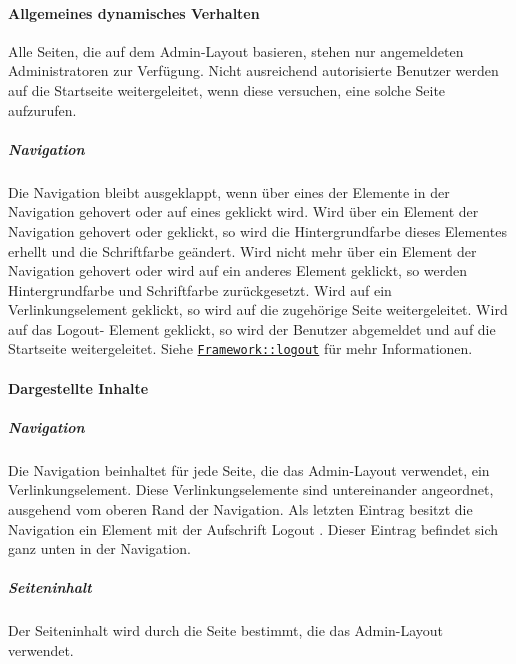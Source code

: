 \paragraph*{Allgemeines dynamisches Verhalten}
Alle Seiten, die auf dem Admin-Layout basieren, stehen nur angemeldeten Administratoren zur Verfügung. 
Nicht ausreichend autorisierte Benutzer werden auf die Startseite weitergeleitet, wenn diese versuchen, eine solche Seite aufzurufen.

\subparagraph*{Navigation}\label{AP_Admin_Layout_Navigation}
Die Navigation bleibt ausgeklappt, wenn über eines der Elemente in der Navigation gehovert oder auf eines geklickt wird.
Wird über ein Element der Navigation gehovert oder geklickt, so wird die Hintergrundfarbe dieses Elementes erhellt und die Schriftfarbe geändert.
Wird nicht mehr über ein Element der Navigation gehovert oder wird auf ein anderes Element geklickt, so werden Hintergrundfarbe und Schriftfarbe zurückgesetzt.
Wird auf ein Verlinkungselement geklickt, so wird auf die zugehörige Seite weitergeleitet.
Wird auf das \dq Logout\dq - Element geklickt, so wird der Benutzer abgemeldet und auf die Startseite weitergeleitet. Siehe \hyperref[AP_Framework_logout]{\texttt{Framework::logout}} für mehr Informationen.

\paragraph*{Dargestellte Inhalte}
\subparagraph*{Navigation}
Die Navigation beinhaltet für jede Seite, die das Admin-Layout verwendet, ein Verlinkungselement. 
Diese Verlinkungselemente sind untereinander angeordnet, ausgehend vom oberen Rand der Navigation.
Als letzten Eintrag besitzt die Navigation ein Element mit der Aufschrift \dq Logout \dq. Dieser Eintrag befindet sich ganz unten in der Navigation.

\subparagraph*{Seiteninhalt}
Der Seiteninhalt wird durch die Seite bestimmt, die das Admin-Layout verwendet.
